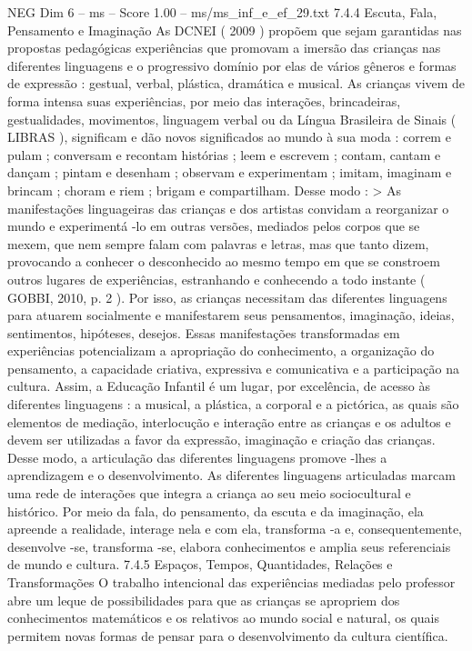 \begin{textsample}{NEG Dim 6 – ms – Score 1.00 – ms/ms\_inf\_e\_ef\_29.txt}  \label{ex:f6_neg_239}
7.4.4 Escuta, Fala, Pensamento e Imaginação As DCNEI ( 2009 ) propõem que sejam garantidas nas propostas pedagógicas experiências que promovam a imersão das crianças nas diferentes linguagens e o progressivo domínio por elas de vários gêneros e formas de expressão : gestual, verbal, plástica, dramática e musical.
As crianças vivem de forma intensa suas experiências, por meio das interações, brincadeiras, gestualidades, movimentos, linguagem verbal ou da Língua Brasileira de Sinais ( LIBRAS ), significam e dão novos significados ao mundo à sua moda : correm e pulam ; conversam e recontam histórias ; leem e escrevem ; contam, cantam e dançam ; pintam e desenham ; observam e experimentam ; imitam, imaginam e brincam ; choram e riem ; brigam e compartilham.
Desse modo : > As manifestações linguageiras das crianças e dos artistas convidam a reorganizar o mundo e experimentá -lo em outras versões, mediados pelos corpos que se mexem, que nem sempre falam com palavras e letras, mas que tanto dizem, provocando a conhecer o desconhecido ao mesmo tempo em que se constroem outros lugares de experiências, estranhando e conhecendo a todo instante ( GOBBI, 2010, p. 2 ).
Por isso, as crianças necessitam das diferentes linguagens para atuarem socialmente e manifestarem seus pensamentos, imaginação, ideias, sentimentos, hipóteses, desejos.
Essas manifestações transformadas em experiências potencializam a apropriação do conhecimento, a organização do pensamento, a capacidade criativa, expressiva e comunicativa e a participação na cultura.
Assim, a Educação Infantil é um lugar, por excelência, de acesso às diferentes linguagens : a musical, a plástica, a corporal e a pictórica, as quais são elementos de mediação, interlocução e interação entre as crianças e os adultos e devem ser utilizadas a favor da expressão, imaginação e criação das crianças.
Desse modo, a articulação das diferentes linguagens promove -lhes a aprendizagem e o desenvolvimento.
As diferentes linguagens articuladas marcam uma rede de interações que integra a criança ao seu meio sociocultural e histórico.
Por meio da fala, do pensamento, da escuta e da imaginação, ela apreende a realidade, interage nela e com ela, transforma -a e, consequentemente, desenvolve -se, transforma -se, elabora conhecimentos e amplia seus referenciais de mundo e cultura. 7.4.5 Espaços, Tempos, Quantidades, Relações e Transformações O trabalho intencional das experiências mediadas pelo professor abre um leque de possibilidades para que as crianças se apropriem dos conhecimentos matemáticos e os relativos ao mundo social e natural, os quais permitem novas formas de pensar para o desenvolvimento da cultura científica.

\end{textsample}
